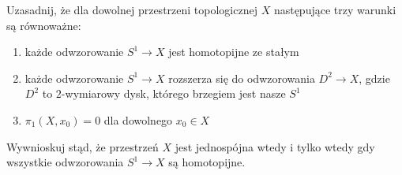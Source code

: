 \begin{problem}
  Uzasadnij, że dla dowolnej przestrzeni topologicznej $X$ następujące trzy warunki są równoważne:
  \begin{enumerate}[label=\alph*)]
    \item każde odwzorowanie $S^1\to X$ jest homotopijne ze stałym
    \item każde odwzorowanie $S^1\to X$ rozszerza się do odwzorowania $D^2\to X$, gdzie $D^2$ to $2$-wymiarowy dysk, którego brzegiem jest nasze $S^1$
    \item $\pi_1(X, x_0)=0$ dla dowolnego $x_0\in X$
  \end{enumerate}
  Wywnioskuj stąd, że przestrzeń $X$ jest jednospójna wtedy i tylko wtedy gdy wszystkie odwzorowania $S^1\to X$ są homotopijne.
\end{problem}

